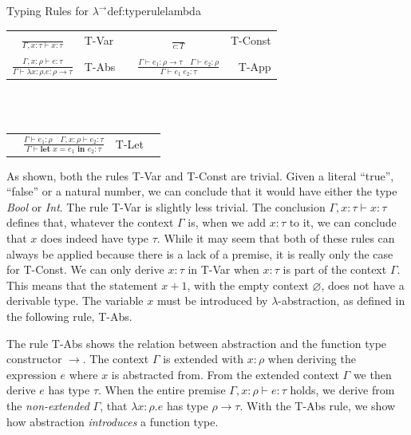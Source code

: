 \begin{definitiontitled}{Typing Rules for $\lambda^\rightarrow$}{def:typerulelambda}
\begin{tabularx}{\textwidth}{ c l X c r}
$ \displaystyle
  \frac
    { }
    { \Gamma, x : \tau \vdash x : \tau }
$ & 
T-Var
&
&
$ \displaystyle
  \frac
    { }
    { c : T }
$
&
T-Const
\\
\\
$ \displaystyle
  \frac
    { \Gamma,x:\rho \vdash e : \tau }
    { \Gamma \vdash \lambda x:\rho.e : \rho \rightarrow \tau}
$
&
T-Abs
&
&
$ \displaystyle
  \frac
    { \Gamma \vdash e_1 : \rho \rightarrow \tau \quad \Gamma \vdash e_2 : \rho }
    { \Gamma \vdash e_1 \: e_2 : \tau }
$
& 
T-App
\\
\end{tabularx}\\
\\

\begin{tabularx}{\textwidth}{X r l X}
 &
$ \displaystyle
  \frac
    { \Gamma \vdash e_1 : \rho \quad \Gamma,x:\rho \vdash e_2 : \tau}
    { \Gamma \vdash \textbf{let } x=e_1 \textbf{ in } e_2 : \tau}
$ 
& 
T-Let
&
\\
\end{tabularx}
\end{definitiontitled}

As shown, both the rules T-Var and T-Const are trivial.
Given a literal ``true'', ``false'' or a natural number, we can conclude that it would have either the type \textit{Bool} or \textit{Int}. 
The rule T-Var is slightly less trivial.
The conclusion $\Gamma, x : \tau \vdash x : \tau$ defines that, whatever the context $\Gamma$ is, when we add $x : \tau$ to it, we can conclude that $x$ does indeed have type $\tau$.
While it may seem that both of these rules can always be applied because there is a lack of a premise, it is really only the case for T-Const.
We can only derive $x : \tau$ in T-Var when $x : \tau$ is part of the context $\Gamma$.
This means that the statement $x + 1$, with the empty context $\varnothing$, does not have a derivable type.
The variable $x$ must be introduced by $\lambda$-abstraction, as defined in the following rule, T-Abs.

The rule T-Abs shows the relation between abstraction and the function type constructor $\rightarrow$.
The context $\Gamma$ is extended with $x:\rho$ when deriving the expression $e$ where $x$ is abstracted from.
From the extended context $\Gamma$ we then derive $e$ has type $\tau$.
When the entire premise $\Gamma, x : \rho \vdash e : \tau$ holds, we derive from the \textit{non-extended} $\Gamma$, that $\lambda x:\rho.e$ has type $\rho \rightarrow \tau$.
With the T-Abs rule, we show how abstraction \textit{introduces} a function type.

